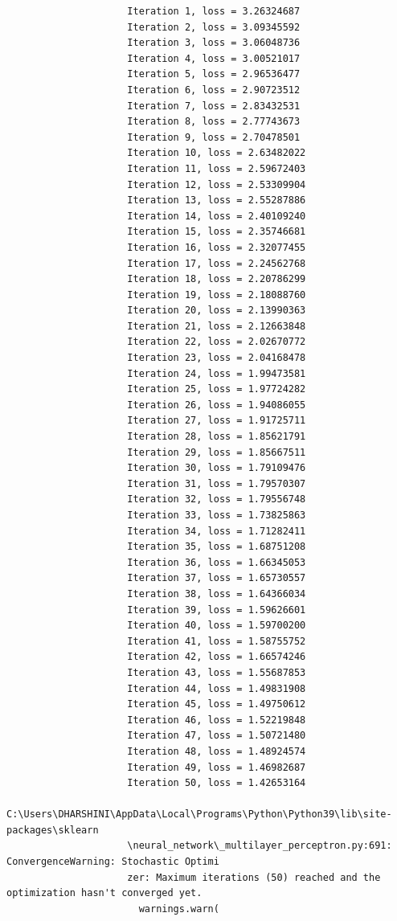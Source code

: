 \documentclass[12pt,a4paper]{article}
\begin{document}
\begin{lstlisting}
                     Iteration 1, loss = 3.26324687
                     Iteration 2, loss = 3.09345592
                     Iteration 3, loss = 3.06048736
                     Iteration 4, loss = 3.00521017
                     Iteration 5, loss = 2.96536477
                     Iteration 6, loss = 2.90723512
                     Iteration 7, loss = 2.83432531
                     Iteration 8, loss = 2.77743673
                     Iteration 9, loss = 2.70478501
                     Iteration 10, loss = 2.63482022
                     Iteration 11, loss = 2.59672403
                     Iteration 12, loss = 2.53309904
                     Iteration 13, loss = 2.55287886
                     Iteration 14, loss = 2.40109240
                     Iteration 15, loss = 2.35746681
                     Iteration 16, loss = 2.32077455
                     Iteration 17, loss = 2.24562768
                     Iteration 18, loss = 2.20786299
                     Iteration 19, loss = 2.18088760
                     Iteration 20, loss = 2.13990363
                     Iteration 21, loss = 2.12663848
                     Iteration 22, loss = 2.02670772
                     Iteration 23, loss = 2.04168478
                     Iteration 24, loss = 1.99473581
                     Iteration 25, loss = 1.97724282
                     Iteration 26, loss = 1.94086055
                     Iteration 27, loss = 1.91725711
                     Iteration 28, loss = 1.85621791
                     Iteration 29, loss = 1.85667511
                     Iteration 30, loss = 1.79109476
                     Iteration 31, loss = 1.79570307
                     Iteration 32, loss = 1.79556748
                     Iteration 33, loss = 1.73825863
                     Iteration 34, loss = 1.71282411
                     Iteration 35, loss = 1.68751208
                     Iteration 36, loss = 1.66345053
                     Iteration 37, loss = 1.65730557
                     Iteration 38, loss = 1.64366034
                     Iteration 39, loss = 1.59626601
                     Iteration 40, loss = 1.59700200
                     Iteration 41, loss = 1.58755752
                     Iteration 42, loss = 1.66574246
                     Iteration 43, loss = 1.55687853
                     Iteration 44, loss = 1.49831908
                     Iteration 45, loss = 1.49750612
                     Iteration 46, loss = 1.52219848
                     Iteration 47, loss = 1.50721480
                     Iteration 48, loss = 1.48924574
                     Iteration 49, loss = 1.46982687
                     Iteration 50, loss = 1.42653164
                     C:\Users\DHARSHINI\AppData\Local\Programs\Python\Python39\lib\site-packages\sklearn
                     \neural_network\_multilayer_perceptron.py:691: ConvergenceWarning: Stochastic Optimi
                     zer: Maximum iterations (50) reached and the optimization hasn't converged yet.
                       warnings.warn(








\end{lstlisting}
\end{document}
